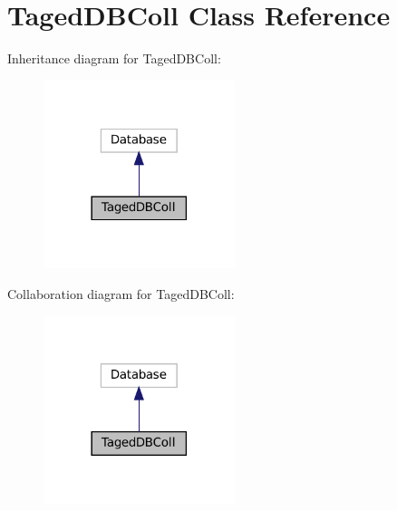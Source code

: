 \hypertarget{class_taged_d_b_coll}{}\section{Taged\+D\+B\+Coll Class Reference}
\label{class_taged_d_b_coll}


Inheritance diagram for Taged\+D\+B\+Coll\+:\nopagebreak
\begin{figure}[H]
\begin{center}
\leavevmode
\includegraphics[width=158pt]{class_taged_d_b_coll__inherit__graph}
\end{center}
\end{figure}


Collaboration diagram for Taged\+D\+B\+Coll\+:\nopagebreak
\begin{figure}[H]
\begin{center}
\leavevmode
\includegraphics[width=158pt]{class_taged_d_b_coll__coll__graph}
\end{center}
\end{figure}

